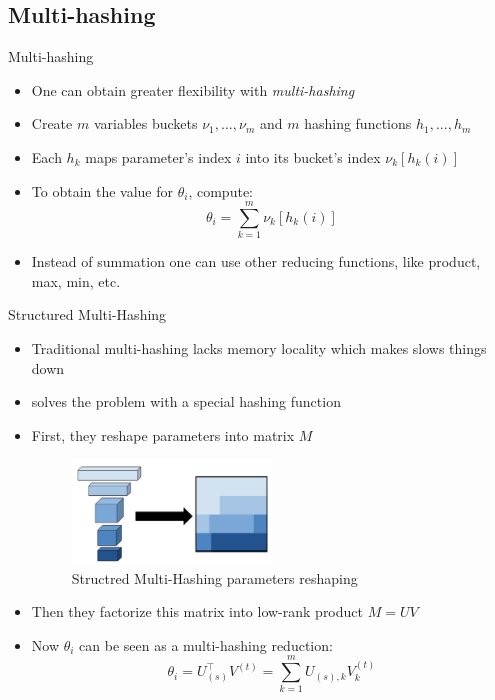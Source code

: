 \documentclass[10pt, handout]{beamer}
\begin{document}
\subsection{Multi-hashing}
\begin{frame}{Multi-hashing}
\begin{itemize}
    \pause\item One can obtain greater flexibility with \textit{multi-hashing}
    \pause\item Create $m$ variables buckets $\nu_1, ..., \nu_m$ and $m$ hashing functions $h_1, ..., h_m$
    \pause\item Each $h_k$ maps parameter's index $i$ into its bucket's index $\nu_k[h_k(i)]$
    \pause\item To obtain the value for $\theta_i$, compute:
    \begin{equation}\label{eq:multi-hashing}
        \theta_i = \sum_{k=1}^m \nu_k[h_k(i)]
    \end{equation}
    \pause\item Instead of summation one can use other reducing functions, like product, max, min, etc.
\end{itemize}
\end{frame}


\begin{frame}{Structured Multi-Hashing}
\begin{itemize}
    \pause\item Traditional multi-hashing lacks memory locality which makes slows things down
    \pause\item \cite{Structured_multi_hashing} solves the problem with a special hashing function
    \pause\item First, they reshape parameters into matrix $M$
    \begin{figure}
        \centering
        \includegraphics[width=0.5\textwidth]{images/structured-multi-hashing-reshaping.png}
        \caption{Structred Multi-Hashing parameters reshaping}
        \label{fig:smh-reshaping}
    \end{figure}
    \pause\item Then they factorize this matrix into low-rank product $M = UV$
    \pause\item Now $\theta_i$ can be seen as a multi-hashing reduction:
    \begin{equation}
        \theta_i = U_{(s)}^\top V^{(t)} = \sum_{k=1}^m U_{(s),k} V^{(t)}_k
    \end{equation}
\end{itemize}
\end{frame}
\end{document}
